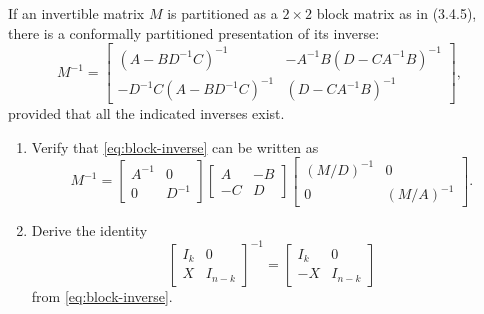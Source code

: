 \documentclass{homework}
\begin{document}
\begin{problem}[P.3.28]
  If an invertible matrix \(M\) is partitioned as a
  \(2\times2\) block matrix as in (3.4.5), there is a conformally
  partitioned presentation of its inverse:
  \begin{equation}
    M^{-1} =
    \begin{bmatrix}
      (A-BD^{-1}C)^{-1}          & -A^{-1} B(D-CA^{-1}B)^{-1} \\
      -D^{-1}C (A-BD^{-1}C)^{-1} & (D-CA^{-1}B)^{-1}
    \end{bmatrix}, \label{eq:block-inverse}
  \end{equation}
  provided that all the indicated inverses exist.
  \begin{enumerate}
  \item Verify that \eqref{eq:block-inverse} can be
    written as
    \begin{equation}
      M^{-1}
      =
      \begin{bmatrix}
        A^{-1} & 0 \\
        0      & D^{-1}
      \end{bmatrix}
      \begin{bmatrix}
        A  & -B \\
        -C & D
      \end{bmatrix}
      \begin{bmatrix}
        (M/D)^{-1} & 0 \\
        0          & (M/A)^{-1}
      \end{bmatrix}. \label{eq:factor-block-inverse}
    \end{equation}

    \begin{solution}
    \end{solution}

  \item Derive the identity
    \[
      \begin{bmatrix}
        I_k & 0 \\
        X   & I_{n-k}
      \end{bmatrix}
      ^{-1} =
      \begin{bmatrix}
        I_k & 0 \\
        -X  & I_{n-k}
      \end{bmatrix}
    \]
    from \eqref{eq:block-inverse}.

    \begin{solution}
    \end{solution}


\end{enumerate}
\end{problem}
\end{document}
